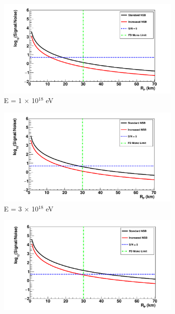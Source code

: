 \begin{figure}
\centering
\begin{subfigure}[b]{0.48\textwidth}
\includegraphics[width=\textwidth]{chapters/graphs/SelectionEff/SignalToNoiseVsDistance_E1e18eV.pdf}
\caption{E = 1 $\times$ 10$^{18}$ eV}
\end{subfigure}
\hspace{3mm}
\begin{subfigure}[b]{0.48\textwidth}
\includegraphics[width=\textwidth]{chapters/graphs/SelectionEff/SignalToNoiseVsDistance_E3e18eV.pdf}
\caption{E = 3 $\times$ 10$^{18}$ eV}
\end{subfigure}
\vspace{3mm}
\begin{subfigure}[b]{0.48\textwidth}
\includegraphics[width=\textwidth]{chapters/graphs/SelectionEff/SignalToNoiseVsDistance_E1e19eV.pdf}

\end{subfigure}
\end{figure}
